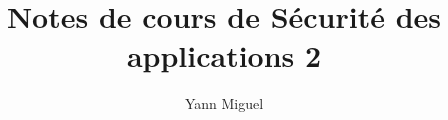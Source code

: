 \documentclass[a4paper, 12pt]{article}
\title{Notes de cours de S\'ecurit\'e des applications 2}
\author{Yann Miguel}
\begin{document}
\ttfamily
\maketitle
\tableofcontents
\newpage





\end{document}
